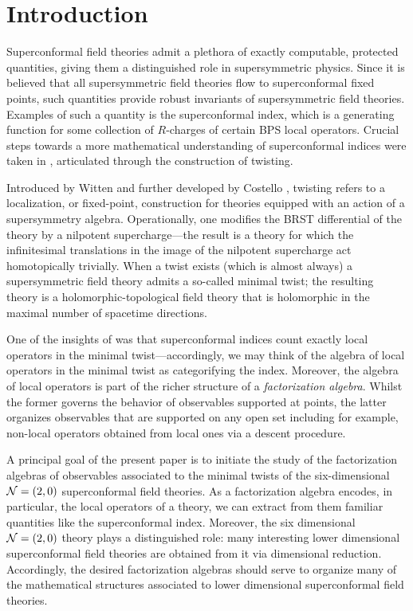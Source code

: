 %
%

%

\section{Introduction}
Superconformal field theories admit a plethora of exactly computable, protected quantities, giving them a distinguished role in supersymmetric physics. 
Since it is believed that all supersymmetric field theories flow to superconformal fixed points, such quantities provide robust invariants of supersymmetric field theories. 
Examples of such a quantity is the superconformal index, which is a generating function for some collection of $R$-charges of certain BPS local operators. 
Crucial steps towards a more mathematical understanding of superconformal indices were taken in \cite{SWchar}, articulated through the construction of twisting.

Introduced by Witten \cite{WittenTwist} and further developed by Costello \cite{CostelloHol}, twisting refers to a localization, or fixed-point, construction for theories equipped with an action of a supersymmetry algebra. 
Operationally, one modifies the BRST differential of the theory by a nilpotent supercharge---the result is a theory for which the infinitesimal translations in the image of the nilpotent supercharge act homotopically trivially. 
When a twist exists (which is almost always) a supersymmetric field theory admits a so-called minimal twist; the resulting theory is a holomorphic-topological field theory that is holomorphic in the maximal number of spacetime directions.

One of the insights of \cite{SWchar} was that superconformal indices count exactly local operators in the minimal twist---accordingly, we may think of the algebra of local operators in the minimal twist as categorifying the index.
Moreover, the algebra of local operators is part of the richer structure of a \textit{factorization algebra}. 
Whilst the former governs the behavior of observables supported at points, the latter organizes observables that are supported on any open set including for example, non-local operators obtained from local ones via a descent procedure.

A principal goal of the present paper is to initiate the study of the factorization algebras of observables associated to the minimal twists of the six-dimensional~$\mathcal N=(2,0)$ superconformal field theories.
As a factorization algebra encodes, in particular, the local operators of a theory, we can extract from them familiar quantities like the superconformal index. Moreover, the six dimensional $\mathcal N = (2,0)$ theory plays a distinguished role: many interesting lower dimensional superconformal field theories are obtained from it via dimensional reduction. Accordingly, the desired factorization algebras should serve to organize many of the mathematical structures associated to lower dimensional superconformal field theories.



